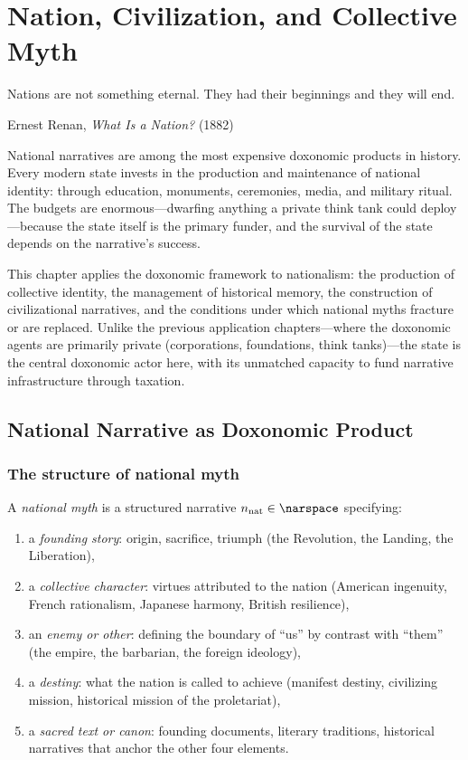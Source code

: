 \chapter{Nation, Civilization, and Collective Myth}
\label{ch:nation-myth}

\epigraph{Nations are not something eternal. They had their beginnings and they will end.}{Ernest Renan, \textit{What Is a Nation?} (1882)}

\noindent
National narratives are among the most expensive doxonomic products in history.
Every modern state invests in the production and maintenance of national identity: through education, monuments, ceremonies, media, and military ritual.
The budgets are enormous---dwarfing anything a private think tank could deploy---because the state itself is the primary funder, and the survival of the state depends on the narrative's success.

This chapter applies the doxonomic framework to nationalism: the production of collective identity, the management of historical memory, the construction of civilizational narratives, and the conditions under which national myths fracture or are replaced.
Unlike the previous application chapters---where the doxonomic agents are primarily private (corporations, foundations, think tanks)---the state is the central doxonomic actor here, with its unmatched capacity to fund narrative infrastructure through taxation.

\section{National Narrative as Doxonomic Product}
\label{sec:ch27-national}

\subsection{The structure of national myth}

\begin{definition}
\label{def:national-myth}
A \emph{national myth} is a structured narrative $n_{\text{nat}} \in \narspace$ specifying:
\begin{enumerate}[nosep]
  \item a \emph{founding story}: origin, sacrifice, triumph (the Revolution, the Landing, the Liberation),
  \item a \emph{collective character}: virtues attributed to the nation (American ingenuity, French rationalism, Japanese harmony, British resilience),
  \item an \emph{enemy or other}: defining the boundary of ``us'' by contrast with ``them'' (the empire, the barbarian, the foreign ideology),
  \item a \emph{destiny}: what the nation is called to achieve (manifest destiny, civilizing mission, historical mission of the proletariat),
  \item a \emph{sacred text or canon}: founding documents, literary traditions, historical narratives that anchor the other four elements.
\end{enumerate}
\end{definition}

